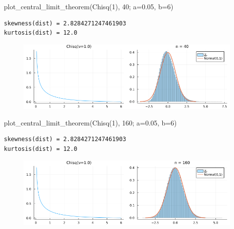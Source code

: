 \documentclass[
  letterpaper,
  DIV=11,
  numbers=noendperiod]{scrartcl}
\newenvironment{Shaded}{\begin{snugshade}}{\end{snugshade}}
\newcommand{\FloatTok}[1]{\textcolor[rgb]{0.68,0.00,0.00}{#1}}
\newcommand{\FunctionTok}[1]{\textcolor[rgb]{0.28,0.35,0.67}{#1}}
\newcommand{\NormalTok}[1]{\textcolor[rgb]{0.00,0.23,0.31}{#1}}
\newcommand{\OperatorTok}[1]{\textcolor[rgb]{0.37,0.37,0.37}{#1}}
\begin{document}
\begin{Shaded}
\begin{Highlighting}[]
\FunctionTok{plot\_central\_limit\_theorem}\NormalTok{(}\FunctionTok{Chisq}\NormalTok{(}\FloatTok{1}\NormalTok{), }\FloatTok{40}\NormalTok{; a}\OperatorTok{=}\FloatTok{0.05}\NormalTok{, b}\OperatorTok{=}\FloatTok{6}\NormalTok{)}
\end{Highlighting}
\end{Shaded}

\begin{verbatim}
skewness(dist) = 2.8284271247461903
kurtosis(dist) = 12.0
\end{verbatim}

\begin{figure}[H]

{\centering \includegraphics{05 Central limit theorem_files/figure-pdf/cell-85-output-2.png}

}

\end{figure}

\begin{Shaded}
\begin{Highlighting}[]
\FunctionTok{plot\_central\_limit\_theorem}\NormalTok{(}\FunctionTok{Chisq}\NormalTok{(}\FloatTok{1}\NormalTok{), }\FloatTok{160}\NormalTok{; a}\OperatorTok{=}\FloatTok{0.05}\NormalTok{, b}\OperatorTok{=}\FloatTok{6}\NormalTok{)}
\end{Highlighting}
\end{Shaded}

\begin{verbatim}
skewness(dist) = 2.8284271247461903
kurtosis(dist) = 12.0
\end{verbatim}

\begin{figure}[H]

{\centering \includegraphics{05 Central limit theorem_files/figure-pdf/cell-86-output-2.png}

}

\end{figure}
\end{document}
